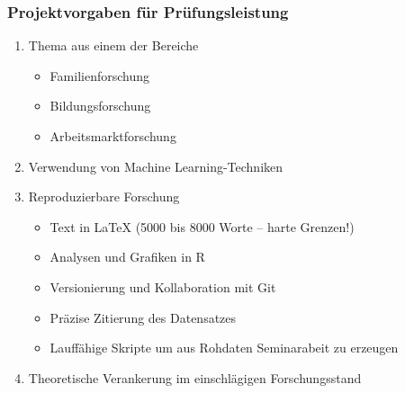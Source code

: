 \documentclass{beamer}
\begin{document}
\begin{frame}
\frametitle{Projektvorgaben für Prüfungsleistung}
\begin{enumerate}
\item Thema aus einem der Bereiche
  \begin{itemize}
  \item Familienforschung
  \item Bildungsforschung
  \item Arbeitsmarktforschung
  \end{itemize}
\item Verwendung von Machine Learning-Techniken
\item Reproduzierbare Forschung
  \begin{itemize}
  \item Text in {\LaTeX} (5000 bis 8000 Worte -- harte Grenzen!)
  \item Analysen und Grafiken in R
  \item Versionierung und Kollaboration mit Git
  \item Präzise Zitierung des Datensatzes
  \item Lauffähige Skripte um aus Rohdaten Seminarabeit zu erzeugen
  \end{itemize}
\item Theoretische Verankerung im einschlägigen Forschungsstand
\end{enumerate}
\end{frame}


\end{document}
